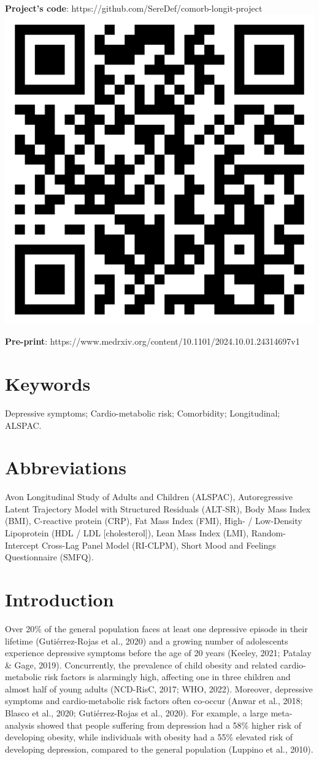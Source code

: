 \documentclass[
  letterpaper,
  DIV=11,
  numbers=noendperiod]{scrreport}
\begin{document}
\textbf{Project's code}:
https://github.com/SereDef/comorb-longit-project\newline
\includegraphics[width=0.2\linewidth,height=\textheight,keepaspectratio]{6.Chapter/../img/qrcode_chap6_repo.png}

\textbf{Pre-print}:
https://www.medrxiv.org/content/10.1101/2024.10.01.24314697v1\newline

\section*{Keywords}\label{keywords-2}


Depressive symptoms; Cardio-metabolic risk; Comorbidity; Longitudinal;
ALSPAC.

\section*{Abbreviations}\label{abbreviations-2}


Avon Longitudinal Study of Adults and Children (ALSPAC), Autoregressive
Latent Trajectory Model with Structured Residuals (ALT-SR), Body Mass
Index (BMI), C-reactive protein (CRP), Fat Mass Index (FMI), High- /
Low-Density Lipoprotein (HDL / LDL {[}cholesterol{]}), Lean Mass Index
(LMI), Random-Intercept Cross-Lag Panel Model (RI-CLPM), Short Mood and
Feelings Questionnaire (SMFQ).

\section{Introduction}\label{introduction-4}

Over 20\% of the general population faces at least one depressive
episode in their lifetime (Gutiérrez-Rojas et al., 2020) and a growing
number of adolescents experience depressive symptoms before the age of
20 years (Keeley, 2021; Patalay \& Gage, 2019). Concurrently, the
prevalence of child obesity and related cardio-metabolic risk factors is
alarmingly high, affecting one in three children and almost half of
young adults (NCD-RisC, 2017; WHO, 2022). Moreover, depressive symptoms
and cardio-metabolic risk factors often co-occur (Anwar et al., 2018;
Blasco et al., 2020; Gutiérrez-Rojas et al., 2020). For example, a large
meta-analysis showed that people suffering from depression had a 58\%
higher risk of developing obesity, while individuals with obesity had a
55\% elevated risk of developing depression, compared to the general
population (Luppino et al., 2010).
\end{document}
